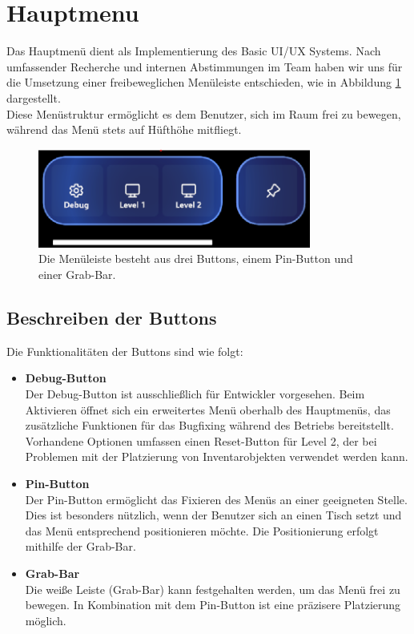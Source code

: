 \section{Hauptmenu}
Das Hauptmenü dient als Implementierung des Basic UI/UX Systems. Nach umfassender Recherche und internen
Abstimmungen im Team haben wir uns für die Umsetzung einer freibeweglichen Menüleiste entschieden, wie in
Abbildung \ref{fig:menübar} dargestellt.
\\
Diese Menüstruktur ermöglicht es dem Benutzer, sich im Raum frei zu bewegen, während das Menü stets
auf Hüfthöhe mitfliegt.

\begin{figure}[h]
    \centering
    \includegraphics[width=0.8\textwidth]{images/menubar.png}
    \caption{Die Menüleiste besteht aus drei Buttons, einem Pin-Button und einer Grab-Bar.}
    \label{fig:menübar}
\end{figure}

\subsection{Beschreiben der Buttons}
Die Funktionalitäten der Buttons sind wie folgt:

\begin{itemize}
    \item \textbf{Debug-Button}\\
    Der Debug-Button ist ausschließlich für Entwickler vorgesehen. Beim Aktivieren öffnet sich ein erweitertes
    Menü oberhalb des Hauptmenüs, das zusätzliche Funktionen für das Bugfixing während des Betriebs bereitstellt.
    Vorhandene Optionen umfassen einen Reset-Button für Level 2, der bei Problemen mit der Platzierung von
    Inventarobjekten verwendet werden kann.

    \item \textbf{Pin-Button}\\
    Der Pin-Button ermöglicht das Fixieren des Menüs an einer geeigneten Stelle. Dies ist besonders nützlich,
    wenn der Benutzer sich an einen Tisch setzt und das Menü entsprechend positionieren möchte. Die
    Positionierung erfolgt mithilfe der Grab-Bar.

    \item \textbf{Grab-Bar}\\
    Die weiße Leiste (Grab-Bar) kann festgehalten werden, um das Menü frei zu bewegen. In Kombination mit dem
    Pin-Button ist eine präzisere Platzierung möglich.
\end{itemize}

